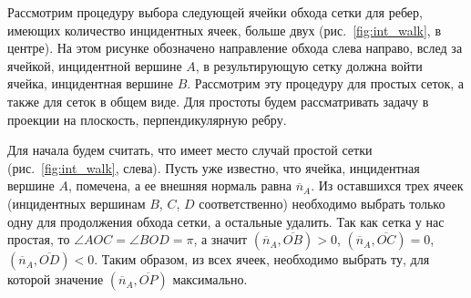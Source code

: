 Рассмотрим процедуру выбора следующей ячейки обхода сетки для ребер, имеющих количество инцидентных ячеек, больше двух (рис.~\ref{fig:int_walk}, в центре).
На этом рисунке обозначено направление обхода слева направо, вслед за ячейкой, инцидентной вершине $A$, в результирующую сетку должна войти ячейка, инцидентная вершине $B$.
Рассмотрим эту процедуру для простых сеток, а также для сеток в общем виде.
Для простоты будем рассматривать задачу в проекции на плоскость, перпендикулярную ребру.

Для начала будем считать, что имеет место случай простой сетки (рис.~\ref{fig:int_walk}, слева).
Пусть уже известно, что ячейка, инцидентная вершине $A$, помечена, а ее внешняя нормаль равна $\overline{n}_A$.
Из оставшихся трех ячеек (инцидентных вершинам $B$, $C$, $D$ соответственно) необходимо выбрать только одну для продолжения обхода сетки, а остальные удалить.
Так как сетка у нас простая, то $\angle AOC = \angle BOD = \pi$, а значит $(\overline{n}_A, \overline{OB}) > 0$, $(\overline{n}_A, \overline{OC}) = 0$, $(\overline{n}_A, \overline{OD}) < 0$.
Таким образом, из всех ячеек, необходимо выбрать ту, для которой значение $(\overline{n}_A, \overline{OP})$ максимально.

